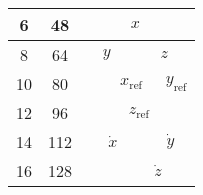 \begin{table}[H]
\begin{tabular}{llclllllllllllllll}
		\multicolumn{1}{|c|}{6}    & \multicolumn{1}{c|}{48}  & \multicolumn{3}{c|}{}                                                    & \multicolumn{10}{c|}{$x$}                                                                                                                                                                                                                                  & \multicolumn{3}{c|}{}                                                       \\ \hline
		\multicolumn{1}{|c|}{8}    & \multicolumn{1}{c|}{64}  & \multicolumn{7}{c|}{$y$}                                                                                                                                                     & \multicolumn{9}{c|}{$z$}                                                                                                                                                                                                             \\ \hline
		\multicolumn{1}{|c|}{10}   & \multicolumn{1}{c|}{80}  & \multicolumn{1}{c|}{}  & \multicolumn{10}{c|}{$x_{\mathrm{ref}}$}                                                                                                                                                                                                                          & \multicolumn{5}{c|}{$y_{\mathrm{ref}}$}                                                                                                  \\ \hline
		\multicolumn{1}{|c|}{12}   & \multicolumn{1}{c|}{96}  & \multicolumn{5}{c|}{}                                                                                                      & \multicolumn{10}{c|}{$z_{\mathrm{ref}}$}                                                                                                                                                                                                                              & \multicolumn{1}{c|}{}   \\ \hline
		\multicolumn{1}{|c|}{14}   & \multicolumn{1}{c|}{112} & \multicolumn{10}{c|}{$\dot{x}$}& \multicolumn{6}{c|}{$\dot{y}$}                                                       \\ \hline
		\multicolumn{1}{|c|}{16}   & \multicolumn{1}{c|}{128} & \multicolumn{5}{c|}{}                                                                                                      & \multicolumn{11}{c|}{$\dot{z}$}                                                                                                                                                                                                                                                        \\ \hline

\end{tabular}
\end{table}
